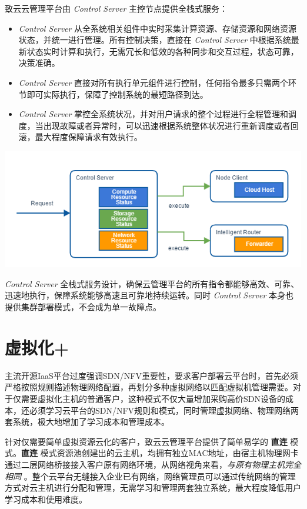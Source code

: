 \documentclass[letterpaper,10pt]{sphinxmanual}
\begin{document}
致云云管理平台由 \emph{Control Server} 主控节点提供全栈式服务：
\begin{itemize}
\item {} 
\emph{Control Server} 从全系统相关组件中实时采集计算资源、存储资源和网络资源状态，并统一进行管理。所有控制决策，直接在 \emph{Control Server} 中根据系统最新状态实时计算和执行，无需冗长和低效的各种同步和交互过程，状态可靠，决策准确。

\item {} 
\emph{Control Server} 直接对所有执行单元组件进行控制，任何指令最多只需两个环节即可实际执行，保障了控制系统的最短路径到达。

\item {} 
\emph{Control Server} 掌控全系统状况，并对用户请求的整个过程进行全程管理和调度，当出现故障或者异常时，可以迅速根据系统整体状况进行重新调度或者回滚，最大程度保障请求有效执行。

\end{itemize}

\includegraphics{1_3_full_stack_service.png}

\emph{Control Server} 全栈式服务设计，确保云管理平台的所有指令都能够高效、可靠、迅速地执行，保障系统能够高速且可靠地持续运转。同时 \emph{Control Server} 本身也提供集群部署模式，不会成为单一故障点。


\section{虚拟化+}
\label{index:id7}
主流开源IaaS平台过度强调SDN/NFV重要性，要求客户部署云平台时，首先必须严格按照规则描述物理网络配置，再划分多种虚拟网络以匹配虚拟机管理需要。对于仅需要虚拟化主机的普通客户，这种模式不仅大量增加采购高价SDN设备的成本，还必须学习云平台的SDN/NFV规则和模式，同时管理虚拟网络、物理网络两套系统，极大地增加了学习成本和管理成本。

针对仅需要简单虚拟资源云化的客户，致云云管理平台提供了简单易学的 \textbf{直连} 模式。\textbf{直连} 模式资源池创建出的云主机，均拥有独立MAC地址，由宿主机物理网卡通过二层网络桥接接入客户原有网络环境，从网络视角来看，\emph{与原有物理主机完全相同} 。整个云平台无缝接入企业已有网络，网络管理员可以通过传统网络的管理方式对云主机进行分配和管理，无需学习和管理两套独立系统，最大程度降低用户学习成本和使用难度。
\end{document}
